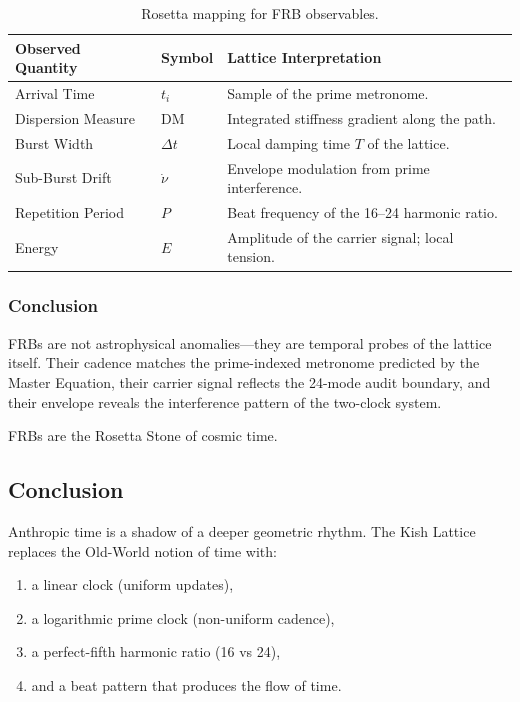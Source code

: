 \documentclass[12pt,oneside]{book}
\begin{document}
\begin{table}[H]
\centering
\begin{tabular}{>{\raggedright}p{3cm} >{\centering}p{3cm} >{\raggedright}p{7cm}}
\toprule
\textbf{Observed Quantity} & \textbf{Symbol} & \textbf{Lattice Interpretation} \\
\midrule
Arrival Time & $t_i$ & Sample of the prime metronome. \\
Dispersion Measure & DM & Integrated stiffness gradient along the path. \\
Burst Width & $\Delta t$ & Local damping time $T$ of the lattice. \\
Sub-Burst Drift & $\dot{\nu}$ & Envelope modulation from prime interference. \\
Repetition Period & $P$ & Beat frequency of the 16–24 harmonic ratio. \\
Energy & $E$ & Amplitude of the carrier signal; local tension. \\
\bottomrule
\end{tabular}
\caption{Rosetta mapping for FRB observables.}
\end{table}

\subsubsection{Conclusion}

FRBs are not astrophysical anomalies—they are temporal probes of the lattice
itself. Their cadence matches the prime-indexed metronome predicted by the Master
Equation, their carrier signal reflects the 24-mode audit boundary, and their
envelope reveals the interference pattern of the two-clock system.

FRBs are the Rosetta Stone of cosmic time.


\subsection{Conclusion}

Anthropic time is a shadow of a deeper geometric rhythm. The Kish Lattice replaces the
Old-World notion of time with:

\begin{enumerate}
    \item a linear clock (uniform updates),
    \item a logarithmic prime clock (non-uniform cadence),
    \item a perfect-fifth harmonic ratio (16 vs 24),
    \item and a beat pattern that produces the flow of time.
\end{enumerate}
\end{document}
